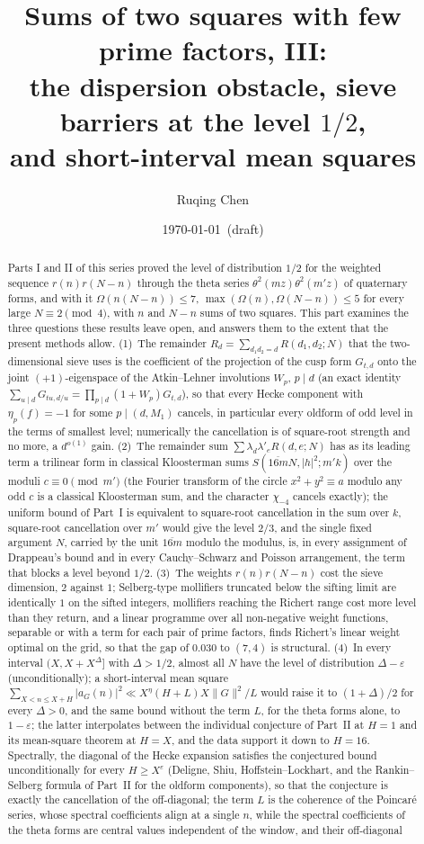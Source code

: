 \documentclass[11pt]{amsart}
\title[Sums of two squares with few prime factors, III]{Sums of two squares with few prime factors, III:\\ the dispersion obstacle, sieve barriers at the level $1/2$,\\ and short-interval mean squares}
\author{Ruqing Chen}
\date{\today\ (draft)}
\theoremstyle{remark}
\newcommand{\e}{\varepsilon}
\begin{document}
\begin{abstract}
Parts I and II of this series proved the level of distribution $1/2$ for the weighted sequence $r(n)r(N-n)$ through the theta series $\theta^2(mz)\theta^2(m'z)$ of quaternary forms, and with it $\Omega(n(N-n))\le7$, $\max(\Omega(n),\Omega(N-n))\le5$ for every large $N\equiv2\pmod 4$, with $n$ and $N-n$ sums of two squares. This part examines the three questions these results leave open, and answers them to the extent that the present methods allow. (1)~The remainder $R_d=\sum_{d_1d_2=d}R(d_1,d_2;N)$ that the two-dimensional sieve uses is the coefficient of the projection of the cusp form $G_{t,d}$ onto the joint $(+1)$-eigenspace of the Atkin--Lehner involutions $W_p$, $p\mid d$ (an exact identity $\sum_{u\mid d}G_{tu,d/u}=\prod_{p\mid d}(1+W_p)G_{t,d}$), so that every Hecke component with $\eta_p(f)=-1$ for some $p\mid(d,M_1)$ cancels, in particular every oldform of odd level in the terms of smallest level; numerically the cancellation is of square-root strength and no more, a $d^{o(1)}$ gain. (2)~The remainder sum $\sum\lambda_d\lambda'_eR(d,e;N)$ has as its leading term a trilinear form in classical Kloosterman sums $S(\overline{16m}N,|h|^2;m'k)$ over the moduli $c\equiv0\pmod{m'}$ (the Fourier transform of the circle $x^2+y^2\equiv a$ modulo any odd $c$ is a classical Kloosterman sum, and the character $\chi_{-4}$ cancels exactly); the uniform bound of Part~I is equivalent to square-root cancellation in the sum over $k$, square-root cancellation over $m'$ would give the level $2/3$, and the single fixed argument $N$, carried by the unit $\overline{16m}$ modulo the modulus, is, in every assignment of Drappeau's bound and in every Cauchy--Schwarz and Poisson arrangement, the term that blocks a level beyond $1/2$. (3)~The weights $r(n)r(N-n)$ cost the sieve dimension, $2$ against $1$; Selberg-type mollifiers truncated below the sifting limit are identically $1$ on the sifted integers, mollifiers reaching the Richert range cost more level than they return, and a linear programme over all non-negative weight functions, separable or with a term for each pair of prime factors, finds Richert's linear weight optimal on the grid, so that the gap of $0.030$ to $(7,4)$ is structural. (4)~In every interval $(X,X+X^\Delta]$ with $\Delta>1/2$, almost all $N$ have the level of distribution $\Delta-\e$ (unconditionally); a short-interval mean square $\sum_{X<n\le X+H}|a_G(n)|^2\ll X^\eta(H+L)X\|G\|^2/L$ would raise it to $(1+\Delta)/2$ for every $\Delta>0$, and the same bound without the term $L$, for the theta forms alone, to $1-\e$; the latter interpolates between the individual conjecture of Part~II at $H=1$ and its mean-square theorem at $H=X$, and the data support it down to $H=16$. Spectrally, the diagonal of the Hecke expansion satisfies the conjectured bound unconditionally for every $H\ge X^\e$ (Deligne, Shiu, Hoffstein--Lockhart, and the Rankin--Selberg formula of Part~II for the oldform components), so that the conjecture is exactly the cancellation of the off-diagonal; the term $L$ is the coherence of the Poincar\'e series, whose spectral coefficients align at a single $n$, while the spectral coefficients of the theta forms are central values independent of the window, and their off-diagonal 
\end{abstract}
\end{document}
